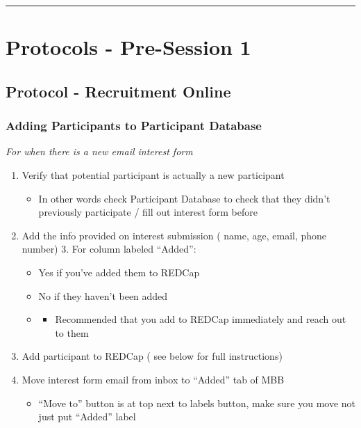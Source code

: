 \documentclass[]{book}
\providecommand{\tightlist}{%
  \setlength{\itemsep}{0pt}\setlength{\parskip}{0pt}}
\begin{document}
\begin{center}\rule{0.5\linewidth}{0.5pt}\end{center}

\hypertarget{protocols---pre-session-1}{%
\section{Protocols - Pre-Session 1}\label{protocols---pre-session-1}}

\hypertarget{protocol---recruitment-online}{%
\subsection{Protocol - Recruitment Online}\label{protocol---recruitment-online}}

\hypertarget{adding-participants-to-participant-database}{%
\subsubsection{Adding Participants to Participant Database}\label{adding-participants-to-participant-database}}

\emph{For when there is a new email interest form }

\begin{enumerate}
\def\labelenumi{\arabic{enumi}.}
\tightlist
\item
  Verify that potential participant is actually a new participant

  \begin{itemize}
  \tightlist
  \item
    In other words check Participant Database to check that they didn't previously participate / fill out interest form before
  \end{itemize}
\item
  Add the info provided on interest submission ( name, age, email, phone number) 3. For column labeled ``Added'':

  \begin{itemize}
  \item
    Yes if you've added them to REDCap
  \item
    No if they haven't been added
  \item
    \begin{itemize}
    \tightlist
    \item
      Recommended that you add to REDCap immediately and reach out to them
    \end{itemize}
  \end{itemize}
\item
  Add participant to REDCap ( see below for full instructions)
\item
  Move interest form email from inbox to ``Added'' tab of MBB

  \begin{itemize}
  \tightlist
  \item
    ``Move to'' button is at top next to labels button, make sure you move not just put ``Added'' label
  \end{itemize}
\end{enumerate}
\end{document}

